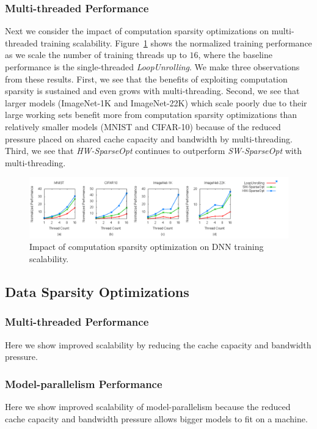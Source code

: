 \subsubsection{Multi-threaded Performance}
Next we consider the impact of computation sparsity optimizations on multi-threaded training scalability.  Figure~\ref{fig:compute_scaling} shows the normalized training performance as we scale the number of training threads up to $16$, where the baseline performance is the single-threaded {\it LoopUnrolling}.   We make three observations from these results.  First, we see that the benefits of exploiting computation sparsity is sustained and even grows with multi-threading.  Second, we see that larger models (ImageNet-1K and ImageNet-22K) which scale poorly due to their large working sets benefit more from computation sparsity optimizations than relatively smaller models (MNIST and CIFAR-10) because of the reduced pressure placed on shared cache capacity and bandwidth by multi-threading.  Third, we see that {\it HW-SparseOpt} continues to outperform {\it SW-SparseOpt} with multi-threading. 

 \begin{figure}
 \centering
 \includegraphics[width=1.95\columnwidth]{Figures/compute_scaling.png}
\caption{Impact of computation sparsity optimization on DNN training scalability.}
 \label{fig:compute_scaling}
 \end{figure}


\subsection{Data Sparsity Optimizations}
\label{subsec:data_sparsity_perf}

\subsubsection{Multi-threaded Performance}
\label{subsec:perf_multi_thread}

Here we show improved scalability by reducing the cache capacity and bandwidth pressure. 


\subsubsection{Model-parallelism Performance}
\label{subsec:perf_model_parallel}

Here we show improved scalability of model-parallelism because the reduced cache capacity and bandwidth pressure allows bigger models to fit on a machine. 

